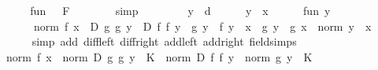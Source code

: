 \begin{isabellebody}
\ \ \ \ \isamarkupfalse%
\ \isamarkupfalse%
\ {\isachardoublequoteopen}{\isacharparenleft}{\kern0pt}{\isacharquery}{\kern0pt}fun{}\ {\isasymlonglongrightarrow}\ {}{\isacharparenright}{\kern0pt}\ {\isacharquery}{\kern0pt}F{\isachardoublequoteclose}\isanewline
\ \ \ \ \ \ \isamarkupfalse%
\ simp\isanewline
\ \ \isamarkupfalse%
\isanewline
\ \ \ \ \isamarkupfalse%
\ y\ {\isacharcolon}{\kern0pt}{\isacharcolon}{\kern0pt}\ {\isacharprime}{\kern0pt}d\isanewline
\ \ \ \ \isamarkupfalse%
\ {\isachardoublequoteopen}y\ {\isasymnoteq}\ x{\isachardoublequoteclose}\isanewline
\ \ \ \ \isamarkupfalse%
\ {\isachardoublequoteopen}{\isacharquery}{\kern0pt}fun{}\ y\ {\isacharequal}{\kern0pt}\isanewline
\ \ \ \ \ \ \ \ norm\ {\isacharparenleft}{\kern0pt}f\ x\ {\isacharasterisk}{\kern0pt}{\isacharasterisk}{\kern0pt}\ {\isacharquery}{\kern0pt}D\ g\ g{\isacharprime}{\kern0pt}\ y\ {\isacharplus}{\kern0pt}\ {\isacharquery}{\kern0pt}D\ f\ f{\isacharprime}{\kern0pt}\ y\ {\isacharasterisk}{\kern0pt}{\isacharasterisk}{\kern0pt}\ g\ y\ {\isacharplus}{\kern0pt}\ f{\isacharprime}{\kern0pt}\ {\isacharparenleft}{\kern0pt}y\ {\isacharminus}{\kern0pt}\ x{\isacharparenright}{\kern0pt}\ {\isacharasterisk}{\kern0pt}{\isacharasterisk}{\kern0pt}\ {\isacharparenleft}{\kern0pt}g\ y\ {\isacharminus}{\kern0pt}\ g\ x{\isacharparenright}{\kern0pt}{\isacharparenright}{\kern0pt}\ {\isacharslash}{\kern0pt}\ norm\ {\isacharparenleft}{\kern0pt}y\ {\isacharminus}{\kern0pt}\ x{\isacharparenright}{\kern0pt}{\isachardoublequoteclose}\isanewline
\ \ \ \ \ \ \isamarkupfalse%
\ {\isacharparenleft}{\kern0pt}simp\ add{\isacharcolon}{\kern0pt}\ diff{\isacharunderscore}{\kern0pt}left\ diff{\isacharunderscore}{\kern0pt}right\ add{\isacharunderscore}{\kern0pt}left\ add{\isacharunderscore}{\kern0pt}right\ field{\isacharunderscore}{\kern0pt}simps{\isacharparenright}{\kern0pt}\isanewline
\ \ \ \ \isamarkupfalse%
\ \isamarkupfalse%
\ {\isachardoublequoteopen}{\isasymdots}\ {\isasymle}\ {\isacharparenleft}{\kern0pt}norm\ {\isacharparenleft}{\kern0pt}f\ x{\isacharparenright}{\kern0pt}\ {\isacharasterisk}{\kern0pt}\ norm\ {\isacharparenleft}{\kern0pt}{\isacharquery}{\kern0pt}D\ g\ g{\isacharprime}{\kern0pt}\ y{\isacharparenright}{\kern0pt}\ {\isacharasterisk}{\kern0pt}\ K\ {\isacharplus}{\kern0pt}\ norm\ {\isacharparenleft}{\kern0pt}{\isacharquery}{\kern0pt}D\ f\ f{\isacharprime}{\kern0pt}\ y{\isacharparenright}{\kern0pt}\ {\isacharasterisk}{\kern0pt}\ norm\ {\isacharparenleft}{\kern0pt}g\ y{\isacharparenright}{\kern0pt}\ {\isacharasterisk}{\kern0pt}\ K\ {\isacharplus}{\kern0pt}\isanewline

\end{isabellebody}
